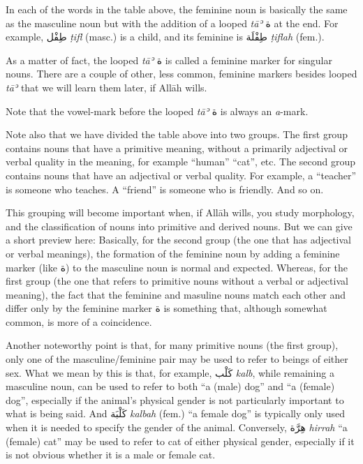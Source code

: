 \documentclass[
  10pt,
]{book}
\begin{document}
In each of the words in the table above, the feminine noun is basically the same as the masculine noun but with the addition of a looped \emph{tāʾ} \foreignlanguage{arabic}{ة} at the end. For example,
\foreignlanguage{arabic}{طِفْل} \emph{ṭifl} (masc.) is a child, and its feminine is
\foreignlanguage{arabic}{طِفْلَة} \emph{ṭiflah} (fem.).

As a matter of fact, the looped \emph{tāʾ} \foreignlanguage{arabic}{ة} is called a feminine marker for singular nouns. There are a couple of other, less common, feminine markers besides looped \emph{tāʾ} that we will learn them later, if Allāh wills.

Note that the vowel-mark before the looped \emph{tāʾ} \foreignlanguage{arabic}{ة} is always an \emph{a}-mark.

Note also that we have divided the table above into two groups. The first group contains nouns that have a primitive meaning, without a primarily adjectival or verbal quality in the meaning, for example \enquote{human} \enquote{cat}, etc.
The second group contains nouns that have an adjectival or verbal quality. For example, a \enquote{teacher} is someone who teaches. A \enquote{friend} is someone who is friendly. And so on.

This grouping will become important when, if Allāh wills, you study morphology, and the classification of nouns into primitive and derived nouns. But we can give a short preview here: Basically, for the second group (the one that has adjectival or verbal meanings), the formation of the feminine noun by adding a feminine marker (like \foreignlanguage{arabic}{ة}) to the masculine noun is normal and expected. Whereas, for the first group (the one that refers to primitive nouns without a verbal or adjectival meaning), the fact that the feminine and masuline nouns match each other and differ only by the feminine marker \foreignlanguage{arabic}{ة} is something that, although somewhat common, is more of a coincidence.

Another noteworthy point is that, for many primitive nouns (the first group), only one of the masculine/feminine pair may be used to refer to beings of either sex. What we mean by this is that, for example,
\foreignlanguage{arabic}{کَلْب} \emph{kalb}, while remaining a masculine noun, can be used to refer to both \enquote{a (male) dog} and \enquote{a (female) dog}, especially if the animal's physical gender is not particularly important to what is being said.
And \foreignlanguage{arabic}{کَلْبَة} \emph{kalbah} (fem.) \enquote{a female dog} is typically only used when it is needed to specify the gender of the animal.
Conversely, \foreignlanguage{arabic}{هِرَّة} \emph{hirrah} \enquote{a (female) cat} may be used to refer to cat of either physical gender, especially if it is not obvious whether it is a male or female cat.
\end{document}
